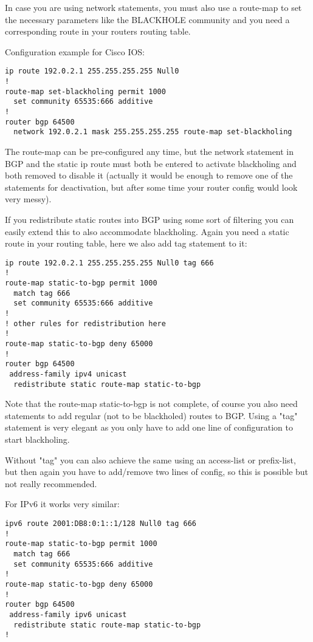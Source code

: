 In case you are using network statements, you must also use a route-map to set the necessary parameters like the BLACKHOLE community and you need a corresponding route in your routers routing table.

Configuration example for Cisco IOS:
\begin{verbatim}
ip route 192.0.2.1 255.255.255.255 Null0
!
route-map set-blackholing permit 1000
  set community 65535:666 additive
!
router bgp 64500
  network 192.0.2.1 mask 255.255.255.255 route-map set-blackholing
\end{verbatim}

The route-map can be pre-configured any time, but the network statement in BGP and the static ip route must both be entered to activate blackholing and both removed to disable it (actually it would be enough to remove one of the statements for deactivation, but after some time your router config would look very messy).

If you redistribute static routes into BGP using some sort of filtering you can easily extend this to also accommodate blackholing. Again you need a static route in your routing table, here we also add tag statement to it:
\begin{verbatim}
ip route 192.0.2.1 255.255.255.255 Null0 tag 666
!
route-map static-to-bgp permit 1000
  match tag 666
  set community 65535:666 additive
!
! other rules for redistribution here
!
route-map static-to-bgp deny 65000
!
router bgp 64500
 address-family ipv4 unicast
  redistribute static route-map static-to-bgp
\end{verbatim}
Note that the route-map static-to-bgp is not complete, of course you also need statements to add regular (not to be blackholed) routes to BGP. Using a "tag" statement is very elegant as you only have to add one line of configuration to start blackholing.

Without "tag" you can also achieve the same using an access-list or prefix-list, but then again you have to add/remove two lines of config, so this is possible but not really recommended.

For IPv6 it works very similar:
\begin{verbatim}
ipv6 route 2001:DB8:0:1::1/128 Null0 tag 666
!
route-map static-to-bgp permit 1000
  match tag 666
  set community 65535:666 additive
!
route-map static-to-bgp deny 65000
!
router bgp 64500
 address-family ipv6 unicast
  redistribute static route-map static-to-bgp
!
\end{verbatim}

